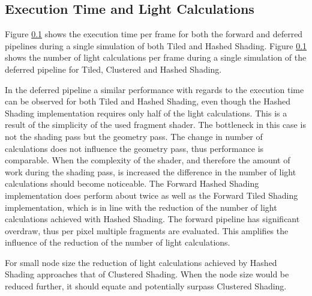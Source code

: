 \subsection{Execution Time and Light Calculations}

Figure \ref{} shows the execution time per frame for both the forward and deferred pipelines
during a single simulation of both Tiled and Hashed Shading. Figure \ref{} shows the
number of light calculations per frame during a single simulation of the deferred pipeline for
Tiled, Clustered and Hashed Shading.

In the deferred pipeline a similar performance with regards to the execution time can be observed for
both Tiled and Hashed Shading, even though the Hashed Shading implementation requires only
half of the light calculations. This is a result of the simplicity of the used fragment shader.
The bottleneck in this case is not the shading pass but the geometry pass. The change in number
of calculations does not influence the geometry pass, thus performance is comparable. When
the complexity of the shader, and therefore the amount of work during the shading pass, is
increased the difference in the number of light calculations should become noticeable.
The Forward Hashed Shading implementation does perform about twice as well as the Forward
Tiled Shading implementation, which is in line with the reduction of the number of light
calculations achieved with Hashed Shading. The forward pipeline has significant overdraw,
thus per pixel multiple fragments are evaluated. This amplifies the influence of the
reduction of the number of light calculations.

For small node size the reduction of light calculations achieved by Hashed Shading approaches
that of Clustered Shading. When the node size would be reduced further, it should equate
and potentially surpass Clustered Shading.



